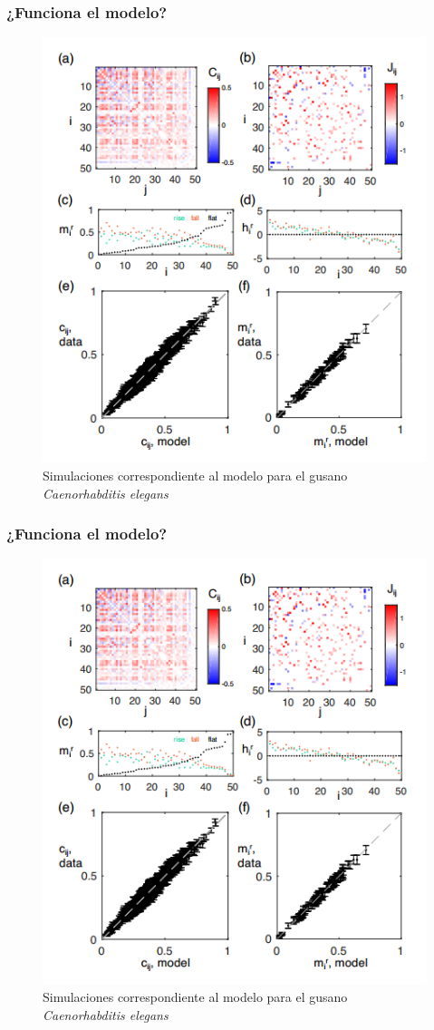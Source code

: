 \documentclass{beamer}
\begin{document}
\begin{frame}
\frametitle{¿Funciona el modelo?}
\begin{figure}
\centering
\includegraphics[scale=0.3]{fig/simulacioncelegans.png}
\caption{Simulaciones correspondiente al modelo para el gusano \textit{Caenorhabditis elegans}}
\end{figure}
\end{frame}

\begin{frame}
\frametitle{¿Funciona el modelo?}
\begin{figure}
\centering
\includegraphics[scale=0.3]{fig/simulacioncelegans.png}
\caption{Simulaciones correspondiente al modelo para el gusano \textit{Caenorhabditis elegans}}


\end{figure}
\end{frame}
\end{document}
